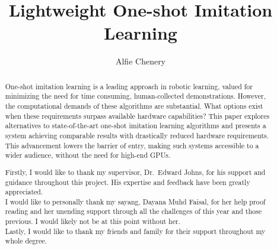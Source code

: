 \documentclass[a4paper, twoside, 12pt]{report}
\title{Lightweight One-shot Imitation Learning}
\author{Alfie Chenery}
\begin{document}


\begin{abstract}
One-shot imitation learning is a leading approach in robotic learning, valued for minimizing the need for time consuming, human-collected demonstrations. However, the computational demands of these algorithms are substantial. What options exist when these requirements surpass available hardware capabilities? This paper explores alternatives to state-of-the-art one-shot imitation learning algorithms and presents a system achieving comparable results with drastically reduced hardware requirements. This advancement lowers the barrier of entry, making such systems accessible to a wider audience, without the need for high-end GPUs.

\end{abstract}

\renewcommand{\abstractname}{Acknowledgements}
\begin{abstract}
Firstly, I would like to thank my supervisor, Dr.~Edward Johns, for his support and guidance throughout this project. His expertise and feedback have been greatly appreciated.
\\

I would like to personally thank my sayang, Dayana Muhd Faisal, for her help proof reading and her unending support through all the challenges of this year and those previous. I would likely not be at this point without her.
\\

Lastly, I would like to thank my friends and family for their support throughout my whole degree. 
\end{abstract}

\tableofcontents










\end{document}
